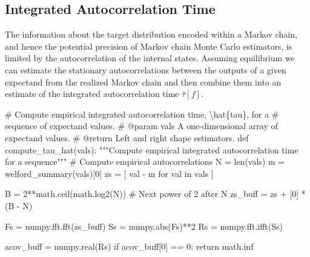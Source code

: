 \documentclass[
  letterpaper,
  DIV=11,
  numbers=noendperiod]{scrartcl}
\newenvironment{Shaded}{\begin{snugshade}}{\end{snugshade}}
\newcommand{\BuiltInTok}[1]{\textcolor[rgb]{0.00,0.23,0.31}{#1}}
\newcommand{\CommentTok}[1]{\textcolor[rgb]{0.37,0.37,0.37}{#1}}
\newcommand{\ControlFlowTok}[1]{\textcolor[rgb]{0.00,0.23,0.31}{#1}}
\newcommand{\DecValTok}[1]{\textcolor[rgb]{0.68,0.00,0.00}{#1}}
\newcommand{\KeywordTok}[1]{\textcolor[rgb]{0.00,0.23,0.31}{#1}}
\newcommand{\NormalTok}[1]{\textcolor[rgb]{0.00,0.23,0.31}{#1}}
\newcommand{\OperatorTok}[1]{\textcolor[rgb]{0.37,0.37,0.37}{#1}}
\begin{document}
\subsection{Integrated Autocorrelation
Time}\label{integrated-autocorrelation-time}

The information about the target distribution encoded within a Markov
chain, and hence the potential precision of Markov chain Monte Carlo
estimators, is limited by the autocorrelation of the internal states.
Assuming equilibrium we can estimate the stationary autocorrelations
between the outputs of a given expectand from the realized Markov chain
and then combine them into an estimate of the integrated autocorrelation
time \(\hat{\tau}[f]\).

\begin{Shaded}
\begin{Highlighting}[]
\CommentTok{\# Compute empirical integrated autocorrelation time, \textbackslash{}hat\{tau\}, for a}
\CommentTok{\# sequence of expectand values.}
\CommentTok{\# @param vals A one{-}dimensional array of expectand values.}
\CommentTok{\# @return Left and right shape estimators.}
\KeywordTok{def}\NormalTok{ compute\_tau\_hat(vals):}
  \CommentTok{"""Compute empirical integrated autocorrelation time for a sequence"""}
  \CommentTok{\# Compute empirical autocorrelations}
\NormalTok{  N }\OperatorTok{=} \BuiltInTok{len}\NormalTok{(vals)}
\NormalTok{  m }\OperatorTok{=}\NormalTok{ welford\_summary(vals)[}\DecValTok{0}\NormalTok{]}
\NormalTok{  zs }\OperatorTok{=}\NormalTok{ [ val }\OperatorTok{{-}}\NormalTok{ m }\ControlFlowTok{for}\NormalTok{ val }\KeywordTok{in}\NormalTok{ vals ]}

\NormalTok{  B }\OperatorTok{=} \DecValTok{2}\OperatorTok{**}\NormalTok{math.ceil(math.log2(N)) }\CommentTok{\# Next power of 2 after N}
\NormalTok{  zs\_buff }\OperatorTok{=}\NormalTok{ zs }\OperatorTok{+}\NormalTok{ [}\DecValTok{0}\NormalTok{] }\OperatorTok{*}\NormalTok{ (B }\OperatorTok{{-}}\NormalTok{ N)}

\NormalTok{  Fs }\OperatorTok{=}\NormalTok{ numpy.fft.fft(zs\_buff)}
\NormalTok{  Ss }\OperatorTok{=}\NormalTok{ numpy.}\BuiltInTok{abs}\NormalTok{(Fs)}\OperatorTok{**}\DecValTok{2}
\NormalTok{  Rs }\OperatorTok{=}\NormalTok{ numpy.fft.ifft(Ss)}

\NormalTok{  acov\_buff }\OperatorTok{=}\NormalTok{ numpy.real(Rs)}
  \ControlFlowTok{if}\NormalTok{ acov\_buff[}\DecValTok{0}\NormalTok{] }\OperatorTok{==} \DecValTok{0}\NormalTok{:}
    \ControlFlowTok{return}\NormalTok{ math.inf}


\end{Highlighting}
\end{Shaded}
\end{document}
